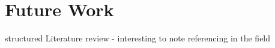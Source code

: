 




\section{Future Work} %
\label{sec:future_work}

structured Literature review - interesting to note referencing in the field


